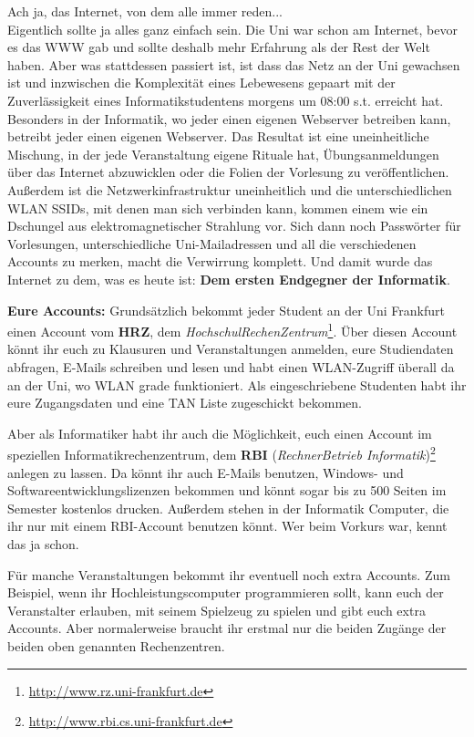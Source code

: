 Ach ja, das Internet, von dem alle immer reden...\\

\spaltenanfang
Eigentlich sollte ja alles ganz einfach sein.
Die Uni war schon am Internet, bevor es das WWW gab und sollte deshalb mehr Erfahrung als der Rest der Welt haben.
Aber was stattdessen passiert ist, ist dass das Netz an der Uni gewachsen ist
und inzwischen die Komplexit\"at eines Lebewesens gepaart mit der
Zuverl\"assigkeit eines Informatikstudentens morgens um 08:00 s.t. erreicht
hat. Besonders in der Informatik, wo jeder einen eigenen Webserver betreiben
kann, betreibt jeder einen eigenen Webserver. Das Resultat ist eine
uneinheitliche Mischung, in der jede Veranstaltung eigene Rituale hat,
\"Ubungsanmeldungen \"uber das Internet abzuwicklen oder die Folien der
Vorlesung zu ver\"offentlichen. Au{\ss}erdem ist die Netzwerkinfrastruktur
uneinheitlich und die unterschiedlichen WLAN SSIDs, mit denen man sich
verbinden kann, kommen einem wie ein Dschungel aus elektromagnetischer
Strahlung vor. Sich dann noch Passw\"orter f\"ur Vorlesungen, unterschiedliche
Uni-Mailadressen und all die verschiedenen Accounts zu merken, macht die
Verwirrung komplett.  Und damit wurde das Internet zu dem, was es heute ist:
\textbf{Dem ersten Endgegner der Informatik}.

\textbf{Eure Accounts:}
Grunds\"atzlich bekommt jeder Student an der Uni Frankfurt einen Account vom \textbf{HRZ}, dem \textit{HochschulRechenZentrum}\footnote{\url{http://www.rz.uni-frankfurt.de}}.
\"Uber diesen Account k\"onnt ihr euch zu Klausuren und Veranstaltungen anmelden, eure Studiendaten abfragen, E-Mails schreiben und lesen und habt einen WLAN-Zugriff \"uberall da an der Uni, wo WLAN grade funktioniert. Als eingeschriebene Studenten habt ihr eure Zugangsdaten und eine TAN Liste zugeschickt bekommen. 

Aber als Informatiker habt ihr auch die M\"oglichkeit, euch einen Account im speziellen Informatikrechenzentrum, dem \textbf{RBI} (\textit{RechnerBetrieb Informatik})\footnote{\url{http://www.rbi.cs.uni-frankfurt.de}} anlegen zu lassen. Da k\"onnt ihr auch E-Mails benutzen, Windows- und Softwareentwicklungslizenzen bekommen und k\"onnt sogar bis zu 500 Seiten im Semester kostenlos drucken. Au{\ss}erdem stehen in der Informatik Computer, die ihr nur mit einem RBI-Account benutzen k\"onnt. Wer beim Vorkurs war, kennt das ja schon.

F\"ur manche Veranstaltungen bekommt ihr eventuell noch extra Accounts. Zum Beispiel, wenn ihr Hochleistungscomputer programmieren sollt, kann euch der Veranstalter erlauben, mit seinem Spielzeug zu spielen und gibt euch extra Accounts. Aber normalerweise braucht ihr erstmal nur die beiden Zug\"ange der beiden oben genannten Rechenzentren.

